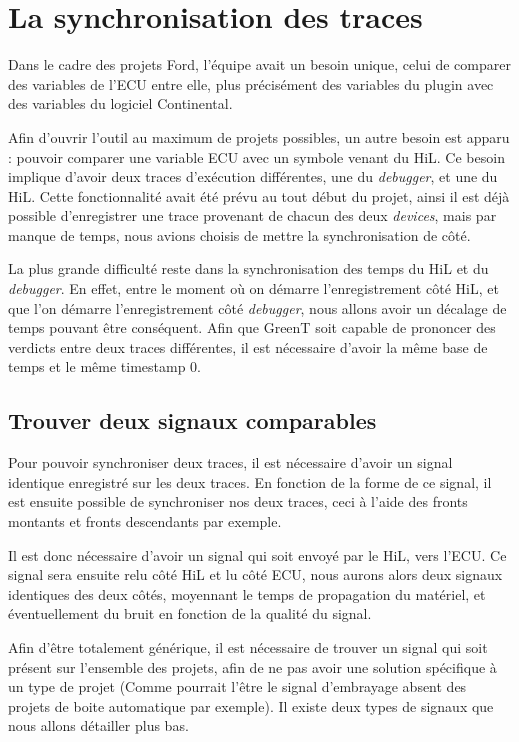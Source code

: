 \section{La synchronisation des traces}\label{synchro}
Dans le cadre des projets Ford, l'équipe avait un besoin unique, celui de comparer des variables de l'ECU entre elle, plus précisément des variables du plugin avec des variables du logiciel Continental.

Afin d'ouvrir l'outil au maximum de projets possibles, un autre besoin est apparu : pouvoir comparer une variable ECU avec un symbole venant du HiL. Ce besoin implique d'avoir deux traces d'exécution différentes, une du \textit{debugger}, et une du HiL. Cette fonctionnalité avait été prévu au tout début du projet, ainsi il est déjà possible d'enregistrer une trace provenant de chacun des deux \textit{devices}, mais par manque de temps, nous avions choisis de mettre la synchronisation de côté.

La plus grande difficulté reste dans la synchronisation des temps du HiL et du \textit{debugger}. En effet, entre le moment où on démarre l'enregistrement côté HiL, et que l'on démarre l'enregistrement côté \textit{debugger}, nous allons avoir un décalage de temps pouvant être conséquent. Afin que GreenT soit capable de prononcer des verdicts entre deux traces différentes, il est nécessaire d'avoir la même base de temps et le même timestamp 0. 

\subsection{Trouver deux signaux comparables}
Pour pouvoir synchroniser deux traces, il est nécessaire d'avoir un signal identique enregistré sur les deux traces. En fonction de la forme de ce signal, il est ensuite possible de synchroniser nos deux traces, ceci à l'aide des fronts montants et fronts descendants par exemple. 

Il est donc nécessaire d'avoir un signal qui soit envoyé par le HiL, vers l'ECU. Ce signal sera ensuite relu côté HiL et lu côté ECU, nous aurons alors deux signaux identiques des deux côtés, moyennant le temps de propagation du matériel, et éventuellement du bruit en fonction de la qualité du signal. 

Afin d'être totalement générique, il est nécessaire de trouver un signal qui soit présent sur l'ensemble des projets, afin de ne pas avoir une solution spécifique à un type de projet (Comme pourrait l'être le signal d'embrayage absent des projets de boite automatique par exemple). Il existe deux types de signaux que nous allons détailler plus bas. 


